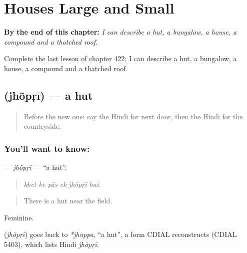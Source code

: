 
\chapter{Houses Large and Small}
\label{ch:hi-houses-large-and-small}

\begin{chapteropening}
\textbf{By the end of this chapter:} \emph{I can describe a hut, a bungalow, a house, a compound and a thatched roof.}

Complete the last lesson of chapter 422: I can describe a hut, a bungalow, a house, a compound and a thatched roof.
\end{chapteropening}

\section[\texorpdfstring{\hi{झोंपड़ी} (jhõpṛī)}{झोंपड़ी (jhõpṛī)}]{ (jhõpṛī) — a hut}

\label{lesson:HI-C422-jhopri}



\begin{quote}
Before the new one: say the Hindi for next door, then the Hindi for the countryside.
\end{quote}

\subsection*{You'll want to know: }
\textbf{} — \emph{jhõpṛī} — \textquotedblleft{}a hut\textquotedblright{}.

\begin{quote}
     
\end{quote}

\begin{quote}
\emph{khet ke pās ek jhõpṛī hai.}
\end{quote}

\begin{quote}
There is a hut near the field.
\end{quote}

Feminine.

\begin{cousinweb}
\textbf{} (\emph{jhõpṛī}) goes back to \emph{*jhuppa}, \textquotedblleft{}a hut\textquotedblright{}, a form CDIAL reconstructs (CDIAL 5403), which lists Hindi \emph{jhõpṛī}.
\end{cousinweb}

